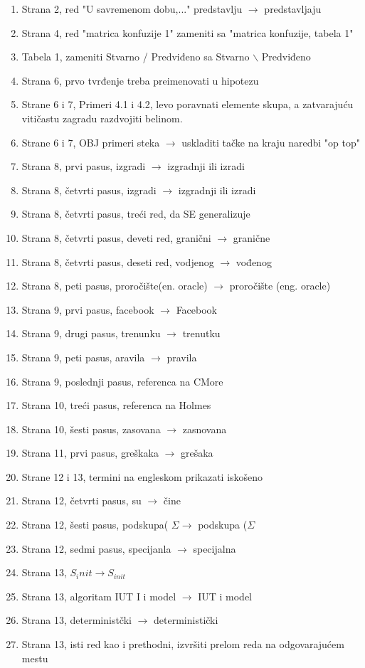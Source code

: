\documentclass[a4paper]{report}
\begin{document}
\begin{enumerate}
\item Strana 2, red "U savremenom dobu,..." predstavlju $\rightarrow$ predstavljaju
\item Strana 4, red "matrica konfuzije 1" zameniti sa "matrica konfuzije, tabela 1"
\item Tabela 1, zameniti Stvarno / Predviđeno sa Stvarno $\backslash$ Predviđeno
\item Strana 6, prvo tvrđenje treba preimenovati u hipotezu
\item Strane 6 i 7, Primeri 4.1 i 4.2, levo poravnati elemente skupa,
a zatvarajuću vitičastu zagradu razdvojiti belinom.
\item Strane 6 i 7, OBJ primeri steka $\rightarrow$ uskladiti tačke na kraju naredbi "op top"
\item Strana 8, prvi pasus, izgradi $\rightarrow$ izgradnji ili izradi
\item Strana 8, četvrti pasus, izgradi $\rightarrow$ izgradnji ili izradi
\item Strana 8, četvrti pasus, treći red, da SE generalizuje
\item Strana 8, četvrti pasus, deveti red, granični $\rightarrow$ granične
\item Strana 8, četvrti pasus, deseti red, vodjenog $\rightarrow$ vođenog
\item Strana 8, peti pasus, proročište(en. oracle) $\rightarrow$ proročište (eng. oracle)
\item Strana 9, prvi pasus, facebook $\rightarrow$ Facebook
\item Strana 9, drugi pasus, trenunku $\rightarrow$ trenutku
\item Strana 9, peti pasus, aravila $\rightarrow$ pravila
\item Strana 9, poslednji pasus, referenca na CMore
\item Strana 10, treći pasus, referenca na Holmes
\item Strana 10, šesti pasus, zasovana $\rightarrow$ zasnovana
\item Strana 11, prvi pasus, greškaka $\rightarrow$ grešaka
\item Strane 12 i 13, termini na engleskom prikazati iskošeno
\item Strana 12, četvrti pasus, su $\rightarrow$ čine
\item Strana 12, šesti pasus, podskupa( $\Sigma \rightarrow$ podskupa ($\Sigma$
\item Strana 12, sedmi pasus, specijanla $\rightarrow$ specijalna
\item Strana 13, $S_init \rightarrow S_{init}$
\item Strana 13, algoritam IUT I i model $\rightarrow$ IUT i model
\item Strana 13, deterministčki $\rightarrow$ deterministički
\item Strana 13, isti red kao i prethodni, izvršiti prelom reda na odgovarajućem mestu
\end{enumerate}
\end{document}
